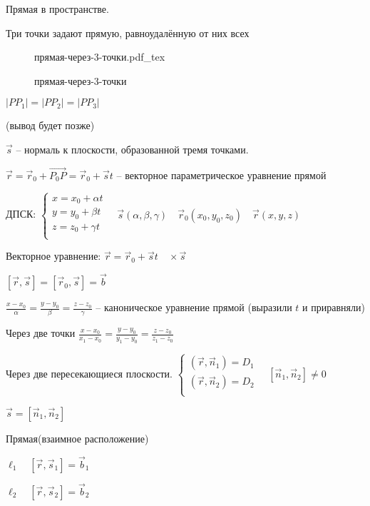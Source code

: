 \documentclass{book}
\theoremstyle{definition}
\newcommand\vect[1]{\overset{\longrightarrow}{#1}}
\newcommand{\incfig}[1]{%
    \def\svgwidth{\columnwidth}
    {#1.pdf_tex}
}
\begin{document}
Прямая в пространстве.

Три точки задают прямую, равноудалённую от них всех

\begin{figure}[ht]
    \centering
    \incfig{прямая-через-3-точки}
    \caption{прямая-через-3-точки}
    \label{fig:прямая через 3 точки}
\end{figure}

$\left| PP_1 \right| = \left| PP_2 \right|  = \left| PP_3 \right|  $

(вывод будет позже)

$\vec s$ -- нормаль к плоскости, образованной тремя точками.

$\vec r = \vec r_0 + \vect{P_0P} = \vec r_0 + \vec st$ -- векторное параметрическое уравнение прямой

ДПСК:
$\begin{cases}
    x = x_0+\alpha t\\
    y = y_0+\beta t\\
    z = z_0+\gamma t\\
\end{cases}\quad \vec s\left( \alpha, \beta, \gamma \right) \quad \vec r_0\left( x_0, y_0, z_0 \right) \quad \vec r\left( x, y, z \right) $ 

Векторное уравнение: $\vec r = \vec r_0 + \vec st\quad \times \vec s$

$\left[ \vec r, \vec s \right] = \left[ \vec r_0, \vec s \right]  = \vec b$

$\frac{x-x_0}{\alpha} = \frac{y-y_0}{\beta} = \frac{z-z_0}{\gamma}$ -- каноническое уравнение прямой (выразили $t$ и приравняли)

Через две точки $\frac{x-x_0}{x_1-x_0} = \frac{y-y_0}{y_1-y_0} = \frac{z-z_0}{z_1-z_0}$ 

Через две пересекающиеся плоскости. $\begin{cases}
    \left( \vec r, \vec n_1 \right) =D_1\\
    \left( \vec r, \vec n_2 \right) =D_2\\
\end{cases}\quad [\vec n_1, \vec n_2]\neq 0$

$\vec s = \left[ \vec n_1, \vec n_2 \right] $ 

Прямая(взаимное расположение)

$\ell_1\quad [\vec r, \vec s_1] = \vec b_1$

$\ell_2\quad [\vec r, \vec s_2] = \vec b_2$
\end{document}
